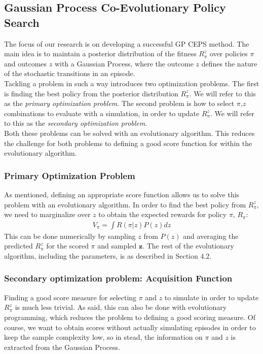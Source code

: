 \subsection{Gaussian Process Co-Evolutionary Policy Search}

The focus of our research is on developing a successful GP CEPS method. The main idea is to maintain a posterior distribution of the fitness $R_{\pi}^z$ over policies $\pi$ and outcomes $z$ with a Gaussian Process, where the outcome $z$ defines the nature of the stochastic transitions in an episode. \\
Tackling a problem in such a way introduces two optimization problems. The first is finding the best policy from the posterior distribution $R_{\pi}^z$. We will refer to this as the \textit{primary optimization problem}. The second problem is how to select $\pi$,$z$ combinations to evaluate with a simulation, in order to update $R_{\pi}^z$. We will refer to this as the \textit{secondary optimization problem}. \\
Both these problems can be solved with an evolutionary algorithm. This reduces the challenge for both problems to defining a good score function for within the evolutionary algorithm.

\subsubsection{Primary Optimization Problem}

As mentioned, defining an appropriate score function allows us to solve this problem with an evolutionary algorithm. In order to find the best policy from $R_{\pi}^z$, we need to marginalize over $z$ to obtain the expected rewards for policy $\pi$, $R_{\pi}$: 
\begin{align}
V_{\pi} = \int R(\pi | z) P(z)dz 
\end{align}
This can be done numerically by sampling $z$ from $P(z)$ and averaging the predicted $R_{\pi}^z$ for the scored $\pi$ and sampled $\mathbf{z}$. The rest of the evolutionary algorithm, including the parameters, is as described in Section 4.2.

\subsubsection{Secondary optimization problem: Acquisition Function}

Finding a good score measure for selecting $\pi$ and $z$ to simulate in order to update $R_{\pi}^z$ is much less trivial. As said, this can also be done with evolutionary programming, which reduces the problem to defining a good scoring measure. Of course, we want to obtain scores without actually simulating episodes in order to keep the sample complexity low, so in stead,  the information on $\pi$ and $z$ is extracted from the Gaussian Process. 

